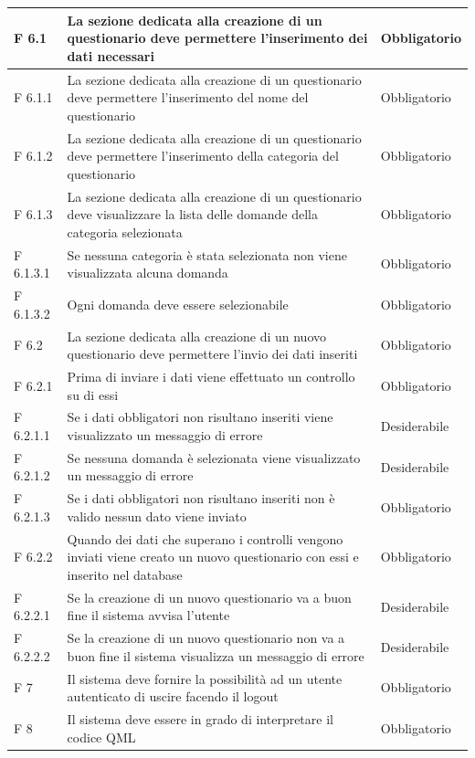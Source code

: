 \documentclass[a4paper,11pt]{article}
\begin{document}
\begin{longtable}{p{}p{}p{}}
\midrule
F 6.1 & La sezione dedicata alla creazione di un questionario deve permettere l'inserimento dei dati necessari & Obbligatorio\\
\midrule
F 6.1.1 & La sezione dedicata alla creazione di un questionario deve permettere l'inserimento del nome del questionario & Obbligatorio\\
\midrule
F 6.1.2 & La sezione dedicata alla creazione di un questionario deve permettere l'inserimento della categoria del questionario & Obbligatorio\\
\midrule
F 6.1.3 & La sezione dedicata alla creazione di un questionario deve visualizzare la lista delle domande della categoria selezionata & Obbligatorio\\
\midrule
F 6.1.3.1 & Se nessuna categoria è stata selezionata non viene visualizzata alcuna domanda & Obbligatorio\\
\midrule
F 6.1.3.2 & Ogni domanda deve essere selezionabile & Obbligatorio\\
\midrule
F 6.2 & La sezione dedicata alla creazione di un nuovo questionario deve permettere l'invio dei dati inseriti & Obbligatorio\\
\midrule
F 6.2.1 & Prima di inviare i dati viene effettuato un controllo su di essi & Obbligatorio\\
\midrule
F 6.2.1.1 & Se i dati obbligatori non risultano inseriti viene visualizzato un messaggio di errore & Desiderabile\\
\midrule
F 6.2.1.2 & Se nessuna domanda è selezionata viene visualizzato un messaggio di errore & Desiderabile\\
\midrule
F 6.2.1.3 & Se i dati obbligatori non risultano inseriti non è valido nessun dato viene inviato & Obbligatorio\\
\midrule
F 6.2.2 & Quando dei dati che superano i controlli vengono inviati viene creato un nuovo questionario con essi e inserito nel database & Obbligatorio\\
\midrule
F 6.2.2.1 & Se la creazione di un nuovo questionario va a buon fine il sistema avvisa l'utente & Desiderabile\\
\midrule
F 6.2.2.2 & Se la creazione di un nuovo questionario non va a buon fine il sistema visualizza un messaggio di errore & Desiderabile\\
\midrule
F 7 & Il sistema deve fornire la possibilità ad un utente autenticato di uscire facendo il logout & Obbligatorio\\
\midrule
F 8 & Il sistema deve essere in grado di interpretare il codice QML & Obbligatorio\\

\end{longtable}
\end{document}
